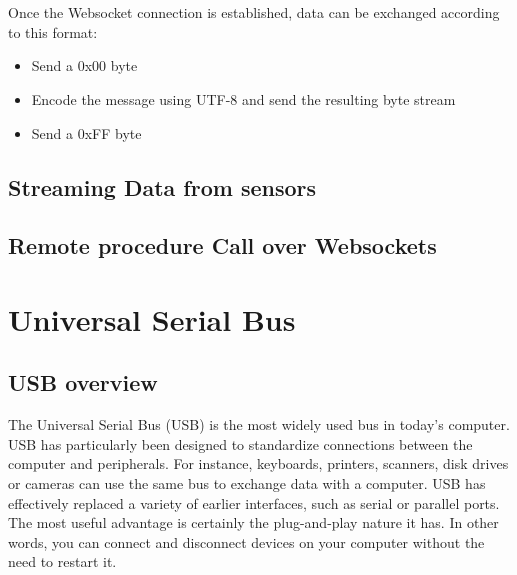 \documentclass[pdftex,12pt,a4paper]{report}
\begin{document}
\\ \\
Once the Websocket connection is established, data can be exchanged according to this format:
\begin{itemize} \itemsep 0em
	\item Send a 0x00 byte
	\item Encode the message using UTF-8 and send the resulting byte stream
	\item Send a 0xFF byte
\end{itemize}

\section{Streaming Data from sensors}
\section{Remote procedure Call over Websockets}
	
\chapter{}

\chapter{Universal Serial Bus}
\section{USB overview}
The Universal Serial Bus (USB) is the most widely used bus in today's computer. USB has particularly been designed to standardize connections between the computer and peripherals. For instance, keyboards, printers, scanners, disk drives or cameras can use the same bus to exchange data with a computer. USB has effectively replaced a variety of earlier interfaces, such as serial or parallel ports. The most useful advantage is certainly the plug-and-play nature it has. In other words, you can connect and disconnect devices on your computer without the need to restart it.\\
\end{document}
